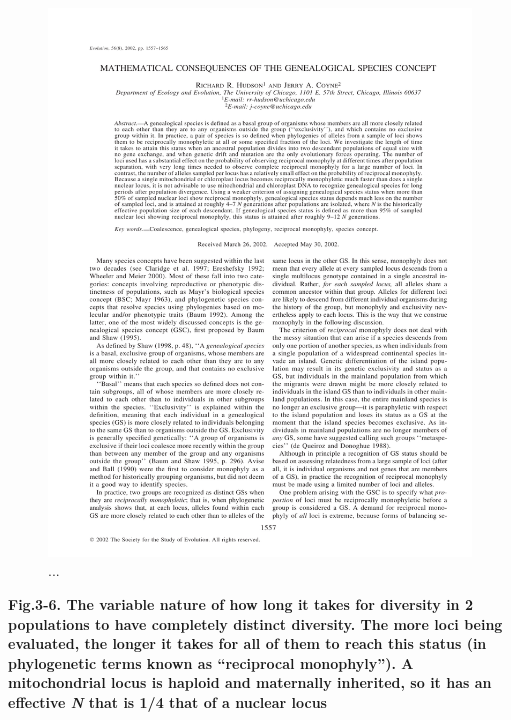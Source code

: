 \documentclass[
]{article}
\begin{document}
\begin{figure}

{\centering \includegraphics[width=0.9\linewidth]{MEImages/hudsoncoyne02} 

}

\caption{...}\label{fig:unnamed-chunk-8}
\end{figure}

\textbf{Fig.3-6. The variable nature of how long it takes for diversity
in 2 populations to have completely distinct diversity. The more loci
being evaluated, the longer it takes for all of them to reach this
status (in phylogenetic terms known as ``reciprocal monophyly''). A
mitochondrial locus is haploid and maternally inherited, so it has an
effective \emph{N} that is 1/4 that of a nuclear locus}
\end{document}
